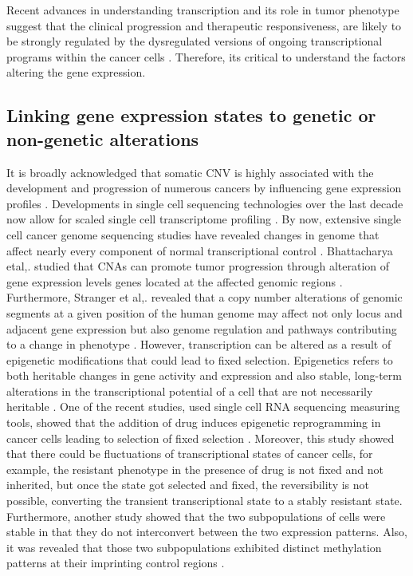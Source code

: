 Recent advances in understanding transcription and its role in tumor phenotype suggest that the clinical progression and therapeutic responsiveness, are likely to be strongly regulated by the dysregulated versions of ongoing transcriptional programs within the cancer cells \cite{lawrence2014discovery, sur2016role}. Therefore, its critical to understand the factors altering the gene expression.

\subsection{Linking gene expression states to genetic or non-genetic alterations}
It is broadly acknowledged that somatic CNV is highly associated with the development and progression of numerous cancers by influencing gene expression profiles \cite{yang2017prame, gut2018sox2}. 
Developments in single cell sequencing technologies over the last decade now allow for scaled single cell transcriptome profiling \cite{zahn2017scalable, zheng2017massively}.
By now, extensive single cell cancer genome sequencing studies have revealed changes in genome that affect nearly every component of normal transcriptional control \cite{garraway2013lessons}. 
Bhattacharya etal,. studied that CNAs can promote tumor progression through alteration of gene expression levels genes located at the affected genomic regions \cite{bhattacharya2020transcriptional, henrichsen2009segmental, tang2013gene}. Furthermore, Stranger et al,. revealed that a copy number alterations of genomic segments at a given position of the human genome may affect not only locus and adjacent gene expression but also genome regulation and pathways contributing to a change in phenotype \cite{stranger2007relative}. However, transcription can be altered as a result of epigenetic modifications that could lead to fixed selection. Epigenetics refers to both heritable changes in gene activity and expression and also stable, long-term alterations in the transcriptional potential of a cell that are not necessarily heritable \cite {aristizabal2020biological, nih2019overview}.
One of the recent studies, used single cell RNA sequencing measuring tools, showed that the addition of drug induces epigenetic reprogramming in cancer cells leading to selection of fixed selection \cite{shaffer2017rare}. Moreover, this study showed that there could be fluctuations of transcriptional states of cancer cells, for example, the resistant phenotype in the presence of drug is not fixed and not inherited, but once the state got selected and fixed, the reversibility is not possible, converting the transient transcriptional state to a stably resistant state. Furthermore, another study showed that the two subpopulations of cells were stable in that they do not interconvert between the two expression patterns. Also, it was revealed that those two subpopulations exhibited distinct methylation patterns at their imprinting control regions \cite{ginart2016visualizing}.


